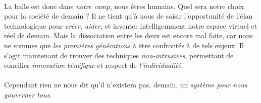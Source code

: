 \paragraph{} La balle est donc dans \emph{notre camp}, nous êtres humains. Quel sera
notre choix pour la société de demain ? Il ne tient qu'à nous de saisir
l'opportunité de l'élan technologique pour \emph{créer, aider}, et inventer
intelligemment notre espace virtuel et réel de demain. Mais la dissociation entre
les deux est encore mal faite, car nous ne sommes que \emph{les premières générations}
à être confrontés à de tels enjeux. Il s'agit maintenant de trouver des techniques
\emph{non-intrusives}, permettant de concilier \emph{innovation bénéfique} et
respect de \emph{l'individualité}.

\paragraph{} Cependant rien ne nous dit qu'il n'existera pas, demain, un \emph{système pour nous
gouverner tous}.